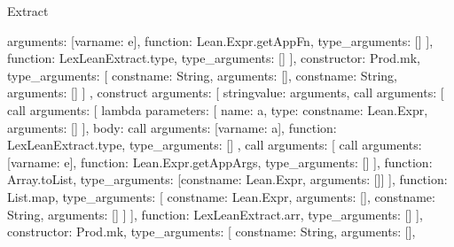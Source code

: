 \begin{lexlean}{Extract}
\begin{toolingmodule}
{{{{{{{{{                              arguments: [var{name: e}],
                              function: Lean.Expr.getAppFn,
                              type_arguments: []
                            }
                          ],
                          function: LexLeanExtract.type,
                          type_arguments: []
                        }
                      ],
                      constructor: Prod.mk,
                      type_arguments: [
                        const{name: String, arguments: []},
                        const{name: String, arguments: []}
                      ]
                    },
                    construct{
                      arguments: [
                        string{value: arguments},
                        call{
                          arguments: [
                            call{
                              arguments: [
                                lambda{
                                  parameters: [
                                    {name: a, type: const{name: Lean.Expr, arguments: []}}
                                  ],
                                  body: call{
                                    arguments: [var{name: a}],
                                    function: LexLeanExtract.type,
                                    type_arguments: []
                                  }
                                },
                                call{
                                  arguments: [
                                    call{
                                      arguments: [var{name: e}],
                                      function: Lean.Expr.getAppArgs,
                                      type_arguments: []
                                    }
                                  ],
                                  function: Array.toList,
                                  type_arguments: [const{name: Lean.Expr, arguments: []}]
                                }
                              ],
                              function: List.map,
                              type_arguments: [
                                const{name: Lean.Expr, arguments: []},
                                const{name: String, arguments: []}
                              ]
                            }
                          ],
                          function: LexLeanExtract.arr,
                          type_arguments: []
                        }
                      ],
                      constructor: Prod.mk,
                      type_arguments: [
                        const{name: String, arguments: []},
}}}}}}}
\end{toolingmodule}
\end{lexlean}
